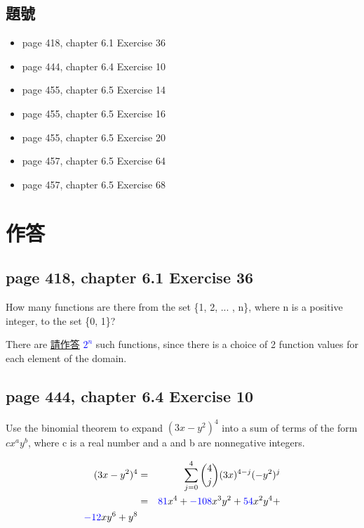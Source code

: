 \documentclass[sigconf]{acmart}
\newcommand{\answer}[2]{%
  \if\relax\detokenize{#2}\relax
    \underline{\mbox{請作答}}%
  \else
    \textcolor{blue}{#2}%
  \fi
}
\begin{document}
\subsection{題號}
\begin{shaded}
\begin{itemize}
    \item[-] page 418, chapter 6.1 Exercise 36
    \item[-] page 444, chapter 6.4 Exercise 10
    \item[-] page 455, chapter 6.5 Exercise 14
    \item[-] page 455, chapter 6.5 Exercise 16
    \item[-] page 455, chapter 6.5 Exercise 20
    \item[-] page 457, chapter 6.5 Exercise 64
    \item[-] page 457, chapter 6.5 Exercise 68
\end{itemize}
\end{shaded}

\section{作答}

\subsection{page 418, chapter 6.1 Exercise 36}
\begin{shaded}
    How many functions are there from the set \{1, 2, ... , n\},
where n is a positive integer, to the set \{0, 1\}?
\end{shaded}  
There are \answer{6.1.36}{$2^n$} such functions, since there is a choice of 2 function values for each element of the domain.


\subsection{page 444, chapter 6.4 Exercise 10}
\begin{shaded}
    Use the binomial theorem to expand $(3x - y^2)^4$ into a sum
of terms of the form $cx^ay^b$, where c is a real number and
a and b are nonnegative integers.
\end{shaded}
\begin{eqnarray*}
(3x - y^2)^4
& = & \sum\limits_{j=0}^4 \dbinom{4}{j} (3x)^{4-j}(-y^2)^j \\
& = & \answer{6.4.10a}{81}x^4 + \answer{6.4.10b}{-108}x^3y^2 + \answer{6.4.10c}{54}x^2y^4 +\\ \answer{6.4.10d}{-12}x y^6 + y^8
\end{eqnarray*}
\end{document}
